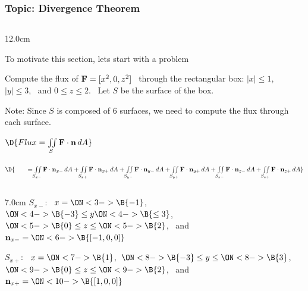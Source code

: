 \begin{frame}
\frametitle{Topic: Divergence Theorem}
\begin{columns}\begin{column}{12.0cm}

\scriptsize

\vspace{0.2cm}

To motivate this section, lets start with a problem

\vspace{0.2cm}

Compute the flux of ${\bf F} = [x^2,0,z^2]$ \, through the rectangular box: $|x| \le 1$, \, $|y| \le 3$, \, and $0 \le z \le 2$. \, Let $S$ be the surface of the box.

\vspace{0.2cm}

Note: Since $S$ is composed of 6 surfaces, we need to compute the flux through each surface.


\vspace{0.2cm}
 
$\D{Flux = \iint \limits_{S} {\bf F} \cdot {\bf n}\, dA}$

$\D{ \qquad = \iint \limits_{S_{x-}} {\bf F} \cdot {\bf n}_{x-}\, dA + \iint \limits_{S_{x+}} {\bf F} \cdot {\bf n}_{x+}\, dA + \iint \limits_{S_{y-}} {\bf F} \cdot {\bf n}_{y-}\, dA + \iint \limits_{S_{y+}} {\bf F} \cdot {\bf n}_{y+}\, dA + \iint \limits_{S_{z-}} {\bf F} \cdot {\bf n}_{z-}\, dA + \iint \limits_{S_{z+}} {\bf F} \cdot {\bf n}_{z+}\, dA}$

\vspace{0.2cm}

\begin{columns}
\begin{column}{7.0cm}
	$S_{x-}$: \, 
	$x=\ON<3->{\B{-1}}$,\, 
	$\ON<4->{\B{-3}} \le y 
	\ON<4->{\B{\le 3}}$,\, 
	$\ON<5->{\B{0}} \le z \le 
	\ON<5->{\B{2}}$, \, and \, ${\bf n}_{x-} = 
	\ON<6->{\B{[-1,0,0]}}$
	
	\vspace{0.4cm}
	
	$S_{x+}$: \, 
	$x=\ON<7->{\B{1}}$,\, 
	$\ON<8->{\B{-3}} \le y \le 
	\ON<8->{\B{3}}$,\, 
	$\ON<9->{\B{0}} \le z \le 
	\ON<9->{\B{2}}$, \, and \, ${\bf n}_{x+} = 
	\ON<10->{\B{[1,0,0]}}$
	
	\vspace{0.4cm}
	

\end{column}
\end{columns}
\end{column}
\end{columns}
\end{frame}
